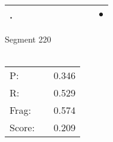 \documentclass[landscape]{article}
\newcommand{\ssp}{\hspace{2pt}}
\newcommand{\mex}{\cellcolor{g}$\bullet$}
\begin{document}
\begin{tabular}{|l|p{10pt}|p{10pt}|p{10pt}|p{10pt}|p{10pt}|p{10pt}|p{10pt}|p{10pt}|p{10pt}|}
\hline
\ssp \cellcolor{ref8}. \ssp&\hspace{2pt}&\hspace{2pt}&\hspace{2pt}&\hspace{2pt}&\hspace{2pt}&\hspace{2pt}&\hspace{2pt}&\hspace{2pt}&\hspace{2pt}\mex\\
\hline
\end{tabular}

\vspace{6pt}
\noindent Segment 220\\\\
\noindent\begin{tabular}{lm{12pt}r}
\hline
P:&&0.346\\
R:&&0.529\\
Frag:&&0.574\\
Score:&&0.209\\
\end{tabular}

\newpage
\end{document}
